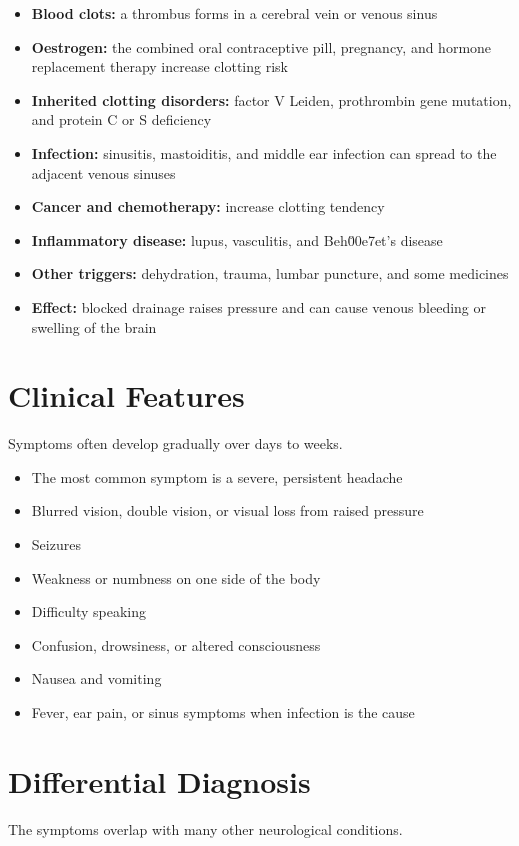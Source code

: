 \begin{itemize}
    \item \textbf{Blood clots:} a thrombus forms in a cerebral vein or venous sinus
    \item \textbf{Oestrogen:} the combined oral contraceptive pill, pregnancy, and hormone replacement therapy increase clotting risk
    \item \textbf{Inherited clotting disorders:} factor V Leiden, prothrombin gene mutation, and protein C or S deficiency
    \item \textbf{Infection:} sinusitis, mastoiditis, and middle ear infection can spread to the adjacent venous sinuses
    \item \textbf{Cancer and chemotherapy:} increase clotting tendency
    \item \textbf{Inflammatory disease:} lupus, vasculitis, and Beh\u00e7et's disease
    \item \textbf{Other triggers:} dehydration, trauma, lumbar puncture, and some medicines
    \item \textbf{Effect:} blocked drainage raises pressure and can cause venous bleeding or swelling of the brain
\end{itemize}

\section*{Clinical Features}
Symptoms often develop gradually over days to weeks.

\begin{itemize}
    \item The most common symptom is a severe, persistent headache
    \item Blurred vision, double vision, or visual loss from raised pressure
    \item Seizures
    \item Weakness or numbness on one side of the body
    \item Difficulty speaking
    \item Confusion, drowsiness, or altered consciousness
    \item Nausea and vomiting
    \item Fever, ear pain, or sinus symptoms when infection is the cause
\end{itemize}

\section*{Differential Diagnosis}
The symptoms overlap with many other neurological conditions.

